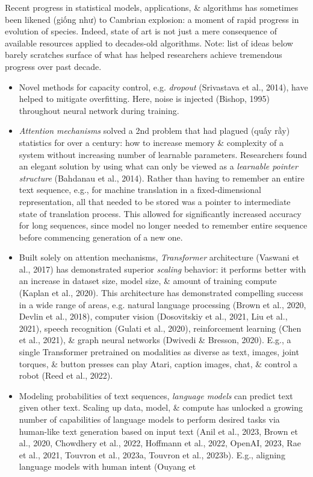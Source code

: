\documentclass{article}
\begin{document}
\begin{itemize}
\begin{itemize}
		Recent progress in statistical models, applications, \& algorithms has sometimes been likened (giống như) to Cambrian explosion: a moment of rapid progress in evolution of species. Indeed, state of art is not just a mere consequence of available resources applied to decades-old algorithms. Note: list of ideas below barely scratches surface of what has helped researchers achieve tremendous progress over past decade.
		\begin{itemize}
			\item Novel methods for capacity control, e.g. {\it dropout} (Srivastava et al., 2014), have helped to mitigate overfitting. Here, noise is injected (Bishop, 1995) throughout neural network during training.
			\item {\it Attention mechanisms} solved a 2nd problem that had plagued (quấy rầy) statistics for over a century: how to increase memory \& complexity of a system without increasing number of learnable parameters. Researchers found an elegant solution by using what can only be viewed as a {\it learnable pointer structure} (Bahdanau et al., 2014). Rather than having to remember an entire text sequence, e.g., for machine translation in a fixed-dimensional representation, all that needed to be stored was a pointer to intermediate state of translation process. This allowed for significantly increased accuracy for long sequences, since model no longer needed to remember entire sequence before commencing generation of a new one.
			\item Built solely on attention mechanisms, {\it Transformer} architecture (Vaswani et al., 2017) has demonstrated superior {\it scaling} behavior: it performs better with an increase in dataset size, model size, \& amount of training compute (Kaplan et al., 2020). This architecture has demonstrated compelling success in a wide range of areas, e.g. natural language processing (Brown et al., 2020, Devlin et al., 2018), computer vision (Dosovitskiy et al., 2021, Liu et al., 2021), speech recognition (Gulati et al., 2020), reinforcement learning (Chen et al., 2021), \& graph neural networks (Dwivedi \& Bresson, 2020). E.g., a single Transformer pretrained on modalities as diverse as text, images, joint torques, \& button presses can play Atari, caption images, chat, \& control a robot (Reed et al., 2022).
			\item Modeling probabilities of text sequences, {\it language models} can predict text given other text. Scaling up data, model, \& compute has unlocked a growing number of capabilities of language models to perform desired tasks via human-like text generation based on input text (Anil et al., 2023, Brown et al., 2020, Chowdhery et al., 2022, Hoffmann et al., 2022, OpenAI, 2023, Rae et al., 2021, Touvron et al., 2023a, Touvron et al., 2023b). E.g., aligning language models with human intent (Ouyang et

\end{itemize}
\end{itemize}
\end{itemize}
\end{document}
